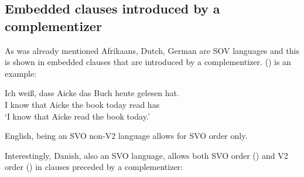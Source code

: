 \subsection{Embedded clauses introduced by a complementizer}

As was already mentioned Afrikaans, Dutch, German are SOV languages and this is shown in embedded
clauses that are introduced by a complementizer. () is an example:

\ea
\gll Ich weiß, dass Aicke das Buch heute gelesen hat.\\
     I know that Aicke the book today read has\\
\glt `I know that Aicke read the book today.'
\z



English, being an SVO non-V2 language allows for SVO order only.
\z

Interestingly, Danish, also an SVO language, allows both SVO order () and V2 order () in clauses
preceded by a complementizer:
\z

